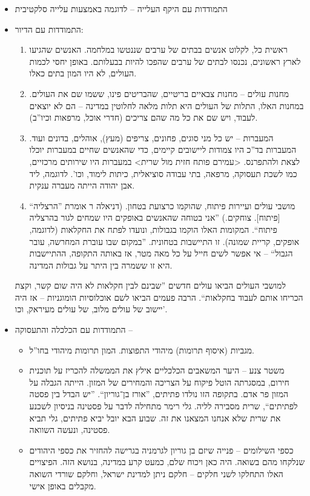 \documentclass[]{../../../../tex/classes/styledArticle}
\begin{document}
	\begin{itemize}
		\item התמודדות עם היקף העלייה – לדוגמה באמצעות עלייה סלקטיבית
		\item התמודדות עם הדיור: 
		\begin{enumerate}
			\item ראשית כל, לקלוט אנשים בבתים של ערבים שננטשו במלחמה. האנשים שהגיעו לארץ ראשונים, נכנסו לבתים של ערבים שהפכו להיות בבעלותם. באופן יחסי לכמות העולים, לא היו המון בתים כאלו. 
			\item מחנות עולים – מחנות צבאיים בריטיים, שהבריטים פינו, ששמו שם את העולים. במחנות האלו, התלות של העולים היא תלות מלאה לחלוטין במדינה – הם לא יוצאים לעבוד, ויש שם את כל מה שהם צריכים (חדרי אוכל, מרפאות וכיו''ב). 
			\item המעברות – יש כל מני סוגים, פחונים, צריפים (מעץ), אוהלים, בדונים ועוד. המעברות בד''כ היו צמודות ליישובים קיימים, כדי שהאנשים שחיים במעברות יוכלו לצאת ולהתפרנס. <עמירם פותח חזית מול שרית> במעברות היו שירותים מרכזיים, כמו לשכת תעסוקה, מרפאה, בתי עבודה סוציאלית, כיתות לימוד, וכו'. לדוגמה, ליד אבן יהודה הייתה מעברה ענקית. 
			\item מושבי עולים ועיירות פיתוח, שהוקמו כרצועת בטחון. (דניאלה ר אומרת ''הרצליה`` [פיתוח]. צוחקים.) ''אני בטוחה שהאנשים באופקים היו שמחים לגור בהרצליה פיתוח``. המקומות האלו הוקמו בגבולות, ונועדו לפתח את החקלאות (לדוגמה, אופקים, קריית שמונה). זו התיישבות בטחונית. ''במקום שבו עוברת המחרשה, עובר הגבול`` – אי אפשר לשים חייל על כל מאה מטר, אז באותה התקופה, ההתיישבות היא זו ששמרה בין היתר על גבולות המדינה. 
		\end{enumerate}
		למושבי העולים הביאו עולים חדשים ''שבינם לבין חקלאות לא היה שום קשר, וקצת הכריחו אותם לעבוד בחקלאות``. הרבה פעמים הביאו לשם אוכלוסיות הומוגניות – אז היה יישוב של עולים מלוב, של עולים מעיראק, וכו'. 
		\item התמודדות עם הכלכלה והתעסוקה – 
		\begin{itemize}
			\item מגביות (איסוף תרומות) מיהודי התפוצות. המון תרומות מיהודי בחו''ל. 
			\item משטר צנע – היער המשאבים הכלכליים אילץ את הממשלה להכריז על תוכנית חירום, במסגרתה הוטל פיקוח על הצריכה והמחירים של המזון. הייתה הגבלה על המזון פר אדם. בתקופה הזו נולדו פתיתים, ''אורז בן־גוריון``. ''יש הבדל בין פסטה לפתיתים``, שרית מסבירה לליה. גלי רימר מתחילה לדבר על פסטינה בניסיון לשכנע את שרית שלא אנחנו המצאנו את זה. שבוע הבא יובל יביא פתיתים, גלי תביא פסטינה, ונעשה השוואה. 
			\item כספי השילומים – פנייה שיזם בן גוריון לגרמניה בגרישה להחזיר את כספי היהודים שנלקחו מהם בשואה. היה כאן ויכוח שלם, כמעט קרע במדינה, בנושא הזה. הפיצויים האלו התחלקו לשני חלקים – חלקם ניתן למדינת ישראל, וחלקם שורדי השואה מקבלים באופן אישי. 

\end{itemize}
\end{itemize}
\end{document}

